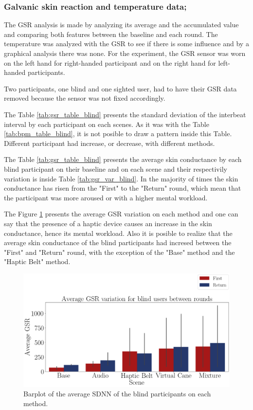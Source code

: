 \subsubsection{Galvanic skin reaction and temperature data;}
\label{subsubsec:results_gsr_temp_1}

The GSR analysis is made by analyzing its average and the accumulated value and comparing both features between the baseline and each round. The temperature was analyzed with the GSR to see if there is some influence and by a graphical analysis there was none. For the experiment, the GSR sensor was worn on the left hand for right-handed participant and on the right hand for left-handed participants.

Two participants, one blind and one sighted user, had to have their GSR data removed because the sensor was not fixed accordingly.

The Table \ref{tab:gsr_table_blind} presents the standard deviation of the interbeat interval by each participant on each scenes. As it was with the Table \ref{tab:bpm_table_blind}, it is not posible to draw a pattern inside this Table. Different participant had increase, or decrease, with different methods.

The Table \ref{tab:gsr_table_blind} presents the average skin conductance by each blind participant on their baseline and on each scene and their respectivily variation is inside Table \ref{tab:gsr_var_blind}. In the majority of times the skin conductance has risen from the "First" to the "Return" round, which mean that the participant was more aroused or with a higher mental workload.





The Figure \ref{fig:barplot_gsr_avg_5_scene_blind} presents the average GSR variation on each method and one can say that the presence of a haptic device causes an increase in the skin conductance, hence its mental workload. Also it is posible to realize that the average skin conductance of the blind participants had incresed between the "First" and "Return" round, with the exception of the "Base" method and the "Haptic Belt" method.

\begin{figure}[!htb]
    \centering
    \includegraphics[width = 0.8\linewidth]{Resultados/GSR/Figuras/png/barplot_gsr_avg_5_scene_blind.png}
    \caption{Barplot of the average SDNN of the blind participants on each method.}
    \label{fig:barplot_gsr_avg_5_scene_blind}
\end{figure}

